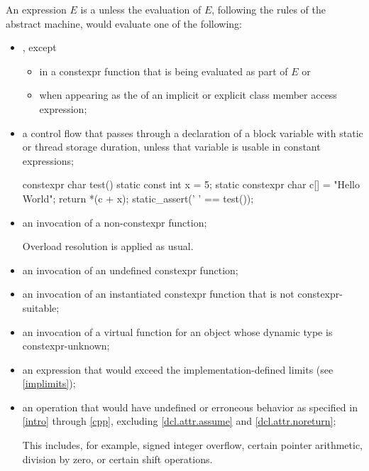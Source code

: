 \pnum
An expression $E$ is a 
unless the evaluation of $E$, following the rules of the abstract
machine, would evaluate one of the following:
\begin{itemize}
\item
{}, except
\begin{itemize}
\item
in a constexpr function
that is being evaluated as part of $E$ or
\item
when appearing as the  of
an implicit or explicit class member access expression;
\end{itemize}

\item
a control flow that passes through
a declaration of a block variable with
static or
thread storage duration,
unless that variable is usable in constant expressions;
\begin{example}
\begin{codeblock}
constexpr char test() {
  static const int x = 5;
  static constexpr char c[] = "Hello World";
  return *(c + x);
}
static_assert(' ' == test());
\end{codeblock}
\end{example}

\item
an invocation of a non-constexpr function;
\begin{footnote}
Overload resolution
is applied as usual.
\end{footnote}

\item
an invocation of an undefined constexpr function;

\item
an invocation of an instantiated constexpr function
that is not constexpr-suitable;

\item
an invocation of a virtual function
for an object whose dynamic type is constexpr-unknown;

\item
an expression that would exceed the implementation-defined
limits (see \ref{implimits});

\item
an operation that would have undefined or erroneous behavior
as specified in \ref{intro} through \ref{cpp},
excluding \ref{dcl.attr.assume} and \ref{dcl.attr.noreturn};
\begin{footnote}
This includes,
for example, signed integer overflow, certain
pointer arithmetic, division by
zero, or certain shift operations.
\end{footnote}


\end{itemize}
